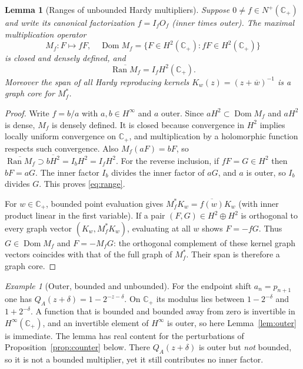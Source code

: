 \documentclass[12pt,letterpaper]{article}
\newtheorem{lemma}[theorem]{Lemma}
\theoremstyle{remark}
\newtheorem{example}[theorem]{Example}
\numberwithin{equation}{section}
\newcommand{\C}{\mathbb C}
\newcommand{\ran}{\operatorname{Ran}}
\newcommand{\Dom}{\operatorname{Dom}}
\newcommand{\Nplus}{N^+(\C_+)}
\begin{document}
\begin{lemma}[Ranges of unbounded Hardy multipliers]\label{lem:range}
Suppose $0\ne f\in\Nplus$ and write its canonical factorization $f=I_fO_f$ (inner times outer). The maximal multiplication operator
\[
 M_f:F\mapsto fF,\quad\Dom M_f=\{F\in H^2(\C_+):fF\in H^2(\C_+)\}
\]
is closed and densely defined, and
\begin{equation}\label{eq:range}
 \overline{\ran M_f}=I_fH^2(\C_+).
\end{equation}
Moreover the span of all Hardy reproducing kernels $K_w(z)=(z+\overline w)^{-1}$ is a graph core for $M_f^*$.
\end{lemma}
\begin{proof}
Write $f=b/a$ with $a,b\in H^\infty$ and $a$ outer. Since $aH^2\subset\Dom M_f$ and $aH^2$ is dense, $M_f$ is densely defined. It is closed because convergence in $H^2$ implies locally uniform convergence on $\C_+$, and multiplication by a holomorphic function respects such convergence. Also $M_f(aF)=bF$, so $\overline{\ran M_f}\supset\overline{bH^2}=I_bH^2=I_fH^2$.
For the reverse inclusion, if $fF=G\in H^2$ then $bF=aG$. The inner factor $I_b$ divides the inner factor of $aG$, and $a$ is outer, so $I_b$ divides $G$. This proves \eqref{eq:range}.

For $w\in\C_+$, bounded point evaluation gives $M_f^*K_w=\overline{f(w)}K_w$ (with inner product linear in the first variable). If a pair $(F,G)\in H^2\oplus H^2$ is orthogonal to every graph vector $(K_w,M_f^*K_w)$, evaluating at all $w$ shows $F=-fG$. Thus $G\in\Dom M_f$ and $F=-M_fG$: the orthogonal complement of these kernel graph vectors coincides with that of the full graph of $M_f^*$. Their span is therefore a graph core.
\end{proof}

\begin{example}[Outer, bounded and unbounded]\label{ex:outer}
For the endpoint shift $a_n=p_{n+1}$ one has
$Q_A(z+\delta)=1-2^{-z-\delta}$.  On $\C_+$ its modulus lies between
$1-2^{-\delta}$ and $1+2^{-\delta}$.  A function that is bounded and
bounded away from zero is invertible in $H^\infty(\C_+)$, and an
invertible element of $H^\infty$ is outer, so here
Lemma~\ref{lem:outer} is immediate.  The lemma has real content for
the perturbations of Proposition~\ref{prop:counter} below.  There
$Q_A(z+\delta)$ is outer but \emph{not} bounded, so it is not a bounded
multiplier, yet it still contributes no inner factor.
\end{example}
\end{document}
